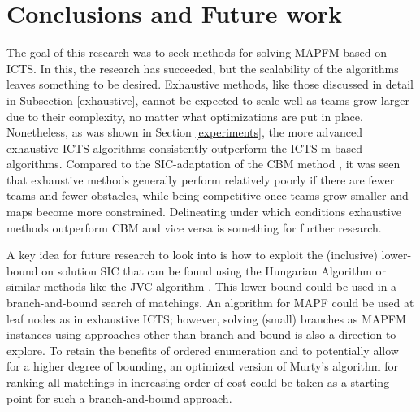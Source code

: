 \documentclass[english]{article}
\begin{document}
	\section{Conclusions and Future work}
	\label{conclusions}
	\label{future}
	The goal of this research was to seek methods for solving MAPFM based on ICTS. In this, the research has succeeded, but the scalability of the algorithms leaves something to be desired. Exhaustive methods, like those discussed in detail in Subsection \ref{exhaustive}, cannot be expected to scale well as teams grow larger due to their complexity, no matter what optimizations are put in place. Nonetheless, as was shown in Section \ref{experiments}, the more advanced exhaustive ICTS algorithms consistently outperform the ICTS-m based algorithms. Compared to the SIC-adaptation of the CBM method \cite{baauw2021}, it was seen that exhaustive methods generally perform relatively poorly if there are fewer teams and fewer obstacles, while being competitive once teams grow smaller and maps become more constrained. Delineating under which conditions exhaustive methods outperform CBM and vice versa is something for further research.
	
	A key idea for future research to look into is how to exploit the (inclusive) lower-bound on solution SIC that can be found using the Hungarian Algorithm \cite{kuhn55} or similar methods like the JVC algorithm \cite{jonker1987}. This lower-bound could be used in a branch-and-bound \cite{land1960} search of matchings. An algorithm for MAPF could be used at leaf nodes as in exhaustive ICTS; however, solving (small) branches as MAPFM instances using approaches other than branch-and-bound is also a direction to explore. To retain the benefits of ordered enumeration and to potentially allow for a higher degree of bounding, an optimized version \cite{miller1997} of Murty's algorithm \cite{murty1968} for ranking all matchings in increasing order of cost could be taken as a starting point for such a branch-and-bound approach. 
	
	
	
	
	
\end{document}
